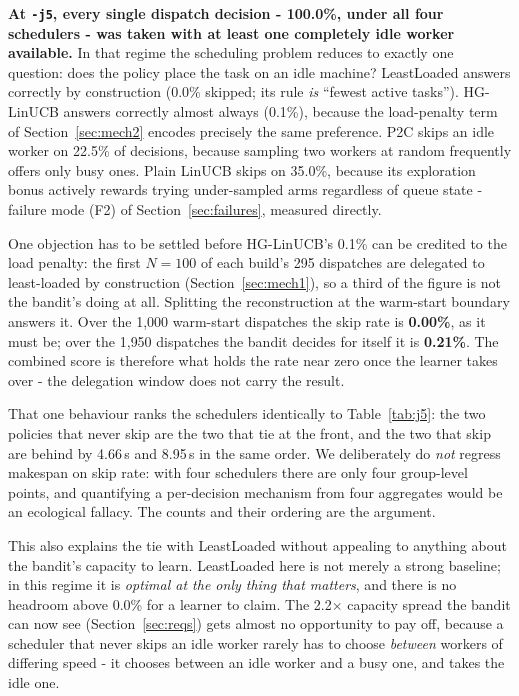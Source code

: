 \documentclass[final,5p,times,twocolumn]{elsarticle}
\begin{document}
\textbf{At \texttt{-j5}, every single dispatch decision - 100.0\%, under all four schedulers - was taken with at least one completely idle worker available.} In that regime the scheduling problem reduces to exactly one question: does the policy place the task on an idle machine? LeastLoaded answers correctly by construction (0.0\% skipped; its rule \emph{is} ``fewest active tasks''). HG-LinUCB answers correctly almost always (0.1\%), because the load-penalty term of Section~\ref{sec:mech2} encodes precisely the same preference. P2C skips an idle worker on 22.5\% of decisions, because sampling two workers at random frequently offers only busy ones. Plain LinUCB skips on 35.0\%, because its exploration bonus actively rewards trying under-sampled arms regardless of queue state - failure mode (F2) of Section~\ref{sec:failures}, measured directly.

One objection has to be settled before HG-LinUCB's 0.1\% can be credited to the load penalty: the first $N=100$ of each build's 295 dispatches are delegated to least-loaded by construction (Section~\ref{sec:mech1}), so a third of the figure is not the bandit's doing at all. Splitting the reconstruction at the warm-start boundary answers it. Over the 1{,}000 warm-start dispatches the skip rate is \textbf{0.00\%}, as it must be; over the 1{,}950 dispatches the bandit decides for itself it is \textbf{0.21\%}. The combined score is therefore what holds the rate near zero once the learner takes over - the delegation window does not carry the result.

That one behaviour ranks the schedulers identically to Table~\ref{tab:j5}: the two policies that never skip are the two that tie at the front, and the two that skip are behind by 4.66\,s and 8.95\,s in the same order. We deliberately do \emph{not} regress makespan on skip rate: with four schedulers there are only four group-level points, and quantifying a per-decision mechanism from four aggregates would be an ecological fallacy. The counts and their ordering are the argument.

This also explains the tie with LeastLoaded without appealing to anything about the bandit's capacity to learn. LeastLoaded here is not merely a strong baseline; in this regime it is \emph{optimal at the only thing that matters}, and there is no headroom above 0.0\% for a learner to claim. The 2.2$\times$ capacity spread the bandit can now see (Section~\ref{sec:reqs}) gets almost no opportunity to pay off, because a scheduler that never skips an idle worker rarely has to choose \emph{between} workers of differing speed - it chooses between an idle worker and a busy one, and takes the idle one.
\end{document}
